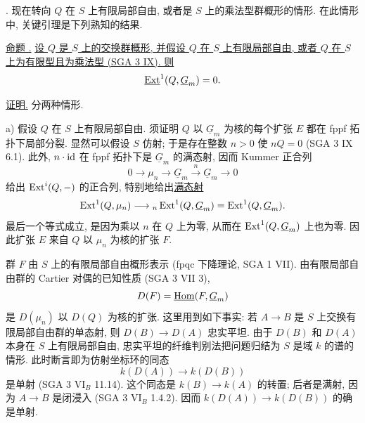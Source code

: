 

\medskip
\noindent {}. 现在转向 $Q$ 在 $S$ 上有限局部自由, 或者是 $S$ 上的乘法型群概形的情形. 在此情形中, 关键引理是下列熟知的结果.

\medskip
\noindent\underline{命题 .} \underline{设 $Q$ 是 $S$ 上的交换群概形, 并假设 $Q$ 在 $S$ 上有限局部自由, 或者 $Q$ 在 $S$ 上为有限型且为乘法型 (SGA 3 IX). 则}
\[
 \uExt^1(Q,\underline G_m)=0.
\]

\noindent\underline{证明.} 分两种情形.

\medskip
\noindent a) 假设 $Q$ 在 $S$ 上有限局部自由. 须证明 $Q$ 以 $\underline G_m$ 为核的每个扩张 $E$ 都在 fppf 拓扑下局部分裂. 显然可以假设 $S$ 仿射; 于是存在整数 $n>0$ 使 $nQ=0$ (SGA 3 IX 6.1). 此外, $n\cdot\mathrm{id}$ 在 fppf 拓扑下是 $\underline G_m$ 的满态射, 因而 Kummer 正合列
\[
 0\longrightarrow\mu_n\longrightarrow\underline G_m
 \xrightarrow{\ n\ }\underline G_m\longrightarrow0
\]
给出 $\operatorname{Ext}^i(Q,-)$ 的正合列, 特别地给出\underline{满态射}
\[
 \Ext^1(Q,\mu_n)\longrightarrow
 {}_n\Ext^1(Q,\underline G_m)=\Ext^1(Q,\underline G_m).
\]
最后一个等式成立, 是因为乘以 $n$ 在 $Q$ 上为零, 从而在 $\Ext^1(Q,\underline G_m)$ 上也为零. 因此扩张 $E$ 来自 $Q$ 以 $\mu_n$ 为核的扩张 $F$.

群 $F$ 由 $S$ 上的有限局部自由概形表示 (fpqc 下降理论, SGA 1 VII). 由有限局部自由群的 Cartier 对偶的已知性质 (SGA 3 VII 3),
\[
 D(F)=\uHom(F,\underline G_m)
\]
是 $D(\mu_n)$ 以 $D(Q)$ 为核的扩张. 这里用到如下事实: 若 $A\longrightarrow B$ 是 $S$ 上交换有限局部自由群的单态射, 则 $D(B)\longrightarrow D(A)$ 忠实平坦. 由于 $D(B)$ 和 $D(A)$ 本身在 $S$ 上有限局部自由, 忠实平坦的纤维判别法把问题归结为 $S$ 是域 $k$ 的谱的情形. 此时断言即为仿射坐标环的同态
\[
 k(D(A))\longrightarrow k(D(B))
\]
是单射 (SGA 3 $\mathrm{VI}_B$ 11.14). 这个同态是 $k(B)\longrightarrow k(A)$ 的转置; 后者是满射, 因为 $A\longrightarrow B$ 是闭浸入 (SGA 3 $\mathrm{VI}_B$ 1.4.2). 因而 $k(D(A))\longrightarrow k(D(B))$ 的确是单射.

